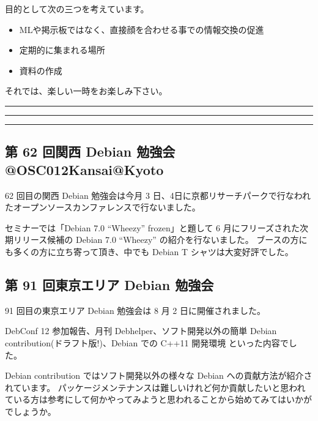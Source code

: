\documentclass[mingoth,a4paper]{jsarticle}
\begin{document}
 目的として次の三つを考えています。
 \begin{itemize}
  \item MLや掲示板ではなく、直接顔を合わせる事での情報交換の促進
  \item 定期的に集まれる場所
  \item 資料の作成
 \end{itemize}

 それでは、楽しい一時をお楽しみ下さい。

\newpage

\begin{minipage}[b]{0.2\hsize}
 {}
\end{minipage}
\begin{minipage}[b]{0.8\hsize}
\hrule
\vspace{2mm}
\hrule
\setcounter{tocdepth}{1}
\tableofcontents
\vspace{2mm}
\hrule
\end{minipage}


\subsection{第 62 回関西 Debian 勉強会@OSC012Kansai@Kyoto}

62 回目の関西 Debian 勉強会は今月 3 日、4日に京都リサーチパークで行なわれたオープンソースカンファレンスで行ないました。

セミナーでは「Debian 7.0  ``Wheezy'' frozen」と題して 6 月にフリーズされた次期リリース候補の Debian 7.0 ``Wheezy'' の紹介を行ないました。
ブースの方にも多くの方に立ち寄って頂き、中でも Debian T シャツは大変好評でした。

\subsection{第 91 回東京エリア Debian 勉強会}
91 回目の東京エリア Debian 勉強会は 8 月 2 日に開催されました。

DebConf 12 参加報告、月刊 Debhelper、ソフト開発以外の簡単 Debian contribution(ドラフト版!)、Debian での C++11 開発環境
といった内容でした。

Debian contribution ではソフト開発以外の様々な Debian への貢献方法が紹介されています。
パッケージメンテナンスは難しいけれど何か貢献したいと思われている方は参考にして何かやってみようと思われることから始めてみてはいかがでしょうか。
\end{document}
